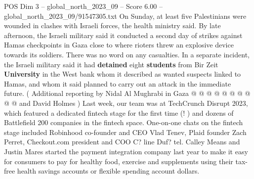 \begin{textsample}{POS Dim 3 – global\_north\_2023\_09 – Score 6.00 – global\_north\_2023\_09/91547305.txt}
On Sunday, at least five Palestinians were wounded in clashes with Israeli forces, the health ministry said.
By late afternoon, the Israeli military said it conducted a second day of strikes against Hamas checkpoints in Gaza close to where rioters threw an explosive device towards its soldiers.
There was no word on any casualties.
In a separate incident, the Israeli military said it had \textbf{detained} eight \textbf{students} from Bir Zeit \textbf{University} in the West bank whom it described as wanted suspects linked to Hamas, and whom it said planned to carry out an attack in the immediate future. ( Additional reporting by Nidal Al Mughrabi in Gaza @ @ @ @ @ @ @ @ @ @ and David Holmes ) Last week, our team was at TechCrunch Disrupt 2023, which featured a dedicated fintech stage for the first time (! ) and dozens of Battlefield 200 companies in the fintech space.
One-on-one chats on the fintech stage included Robinhood co-founder and CEO Vlad Tenev, Plaid founder Zach Perret, Checkout.com president and COO C? line Duf? tel.
Calley Means and Justin Mares started the payment integration company last year to make it easy for consumers to pay for healthy food, exercise and supplements using their tax-free health savings accounts or flexible spending account dollars.

\end{textsample}
